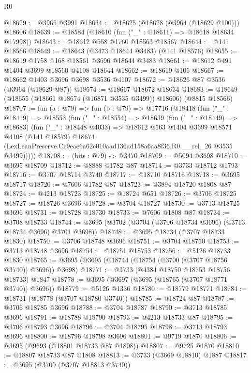 \begin{lexlean}{R0}
\begin{coremodule}
@18629 := @3965 @3991
@18634 := @18625 (@18628 (@3964 (@18629 @100))) @18606
@18639 := @18584 (@18610 (fun ("_" : @18611) => @18618 @18634 @17998))
@18643 := @18612 @558 @1760 @18563 @18567
@18644 := @141 @18566
@18649 := @18643 (@3473 @18644 @3483) (@141 @18576)
@18655 := @18619 @1758 @168 @18561 @3696 @18644 @3483
@18661 := @18612 @491 @1404 @3699 @18560 @4108 @18644
@18662 := @18619 @106
@18667 := @18662 @1403 @3696 @3698 @3536 @4107
@18672 := @18626 @87 @3536 (@3964 (@18629 @87))
@18674 := @18667 @18672 @18634
@18683 := @18649 (@18655 (@18661 @18674 (@16871 @3535 @3499)) @18606) (@8815 @18566)
@18707 := fun (a : @79) =>
  fun (b : @79) =>
  @17716
    (@18418
      (fun ("_" : @18419) =>
      @18553
        (fun ("_" : @18554) =>
        @18639
          (fun ("_" : @18449) => @18683)
          (fun ("_" : @18448 @4033) =>
          @18612
            @563
            @1404
            @3699
            @18571
            @4108
            (@141 @18579)
            @18674
            (LexLeanPreserve.Cc9eae6a62c010aad136ad158a6aa8f36.R0.__rel_26 @3535 @3499)))))
@18708 := (bits : @79) -> @3470
@18709 := @5094 @3698
@18710 := @3695 @18709
@18712 := @8888 @1782 @87
@18714 := @3733 @18712 @1793
@18716 := @3707 @18714 @3740
@18717 := @18710 @18716
@18718 := @3695 @18717
@18720 := @7606 @1782 @87
@18723 := @3894 @18720 @1808 @87
@18724 := @4213 @18723
@18725 := @18724 @651
@18726 := @3706 @18725
@18727 := @18726 @3696
@18728 := @3704 @18727
@18730 := @3713 @18725 @3696
@18731 := @18728 @18730
@18733 := @7606 @1808 @87
@18734 := @3708 @18733
@18744 := @3695 (@3702 (@3704 (@3706 @18734 @3696) (@3713 @18734 @3696) @3701 @3698))
@18748 := @3695 @18734 (@3707 @18733 @1830)
@18750 := @3706 @18748 @3696
@18751 := @3704 @18750
@18753 := @3713 @18748 @3696
@18754 := @18751 @18753
@18756 := @5126 @18733 @1830
@18765 := @3695 (@3695 (@18744 (@18754 (@3700 (@3707 @18756 @3740)) @3696)) @3698)
@18771 := @3733 (@4384 @18750 @18753 @18756 @18733) @1847
@18778 := @3695 (@3697 (@3695 (@18765 (@3707 @18771 @3740)) @3696))
@18779 := @5126 @1336
@18780 := @18779 @18771
@18784 := @18731 (@18778 (@3707 @18780 @3740))
@18785 := @18724 @87
@18787 := @3706 @18785 @3696
@18788 := @3704 @18787
@18790 := @3713 @18785 @3696
@18791 := @18788 @18790
@18793 := @4213 @18733 @87
@18795 := @3706 @18793 @3696
@18796 := @3704 @18795
@18798 := @3713 @18793 @3696
@18800 := @18796 @18798 @3696
@18801 := @9719 @1870
@18806 := @3695 (@9693 (@18801 @18733 @87 @1808))
@18807 := @9725 @1870
@18810 := @18807 @18733 @87 @1808
@18813 := @3733 (@3669 @18810) @1887
@18817 := @3695 (@3700 (@3707 @18813 @3740))

\end{coremodule}
\end{lexlean}
